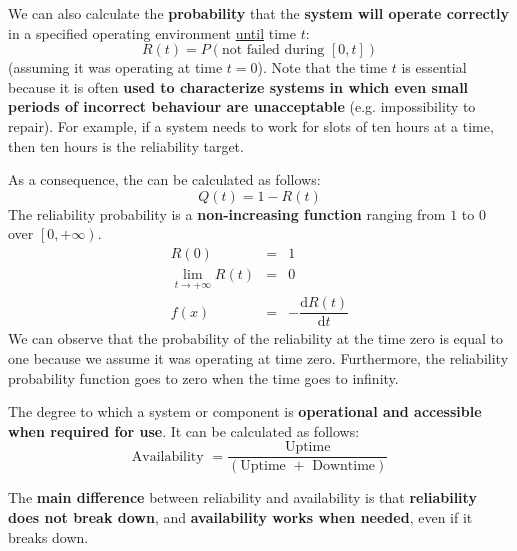 \highspace
We can also calculate the \textbf{probability} that the \textbf{system will operate correctly} in a specified operating environment \underline{until} time $t$:
\begin{equation}\label{eq: reliability probability}
    R\left(t\right) = P\left(\text{not failed during } \left[0,t\right]\right)
\end{equation}
(assuming it was operating at time $t=0$). Note that the time $t$ is essential because it is often \textbf{used to characterize systems in which even small periods of incorrect behaviour are unacceptable} (e.g. impossibility to repair). For example, if a system needs to work for slots of ten hours at a time, then ten hours is the reliability target.

\highspace
As a consequence, the  can be calculated as follows:
\begin{equation}
    Q\left(t\right) = 1 - R\left(t\right)
\end{equation}
The reliability probability is a \textbf{non-increasing function} ranging from $1$ to $0$ over $\left.\left[0, +\infty\right.\right)$.
\begin{equation}
    \begin{array}{rcl}
        R\left(0\right) &=& 1 \\ [.5em]
        \lim\limits_{t \rightarrow +\infty} R\left(t\right) &=& 0 \\ [.5em]
        f\left(x\right) &=& -\dfrac{\mathrm{d}R\left(t\right)}{\mathrm{d}t}
    \end{array}
\end{equation}
We can observe that the probability of the reliability at the time zero is equal to one because we assume it was operating at time zero. Furthermore, the reliability probability function goes to zero when the time goes to infinity.

\highspace
\begin{definitionbox}[: Availability]
    The degree to which a system or component is \textbf{operational and accessible when required for use}. It can be calculated as follows:
    \begin{equation}
        \text{Availability } = \dfrac{\text{Uptime}}{\left(\text{Uptime } + \text{ Downtime}\right)}
    \end{equation}
\end{definitionbox}

\highspace
The \textbf{main difference} between reliability and availability is that \textbf{reliability does not break down}, and \textbf{availability works when needed}, even if it breaks down.

